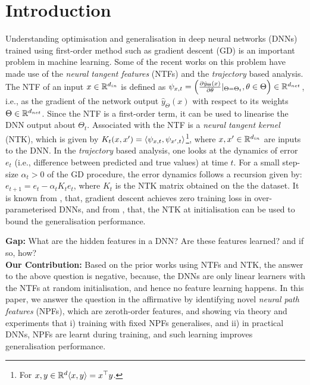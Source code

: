 \section{Introduction}
Understanding optimisation and generalisation in deep neural networks (DNNs) trained using first-order method such as gradient descent (GD) is an important problem in machine learning. Some of the recent works on this problem have made use of the \emph{neural tangent features} (NTFs) and the \emph{trajectory} based analysis. The NTF of an input $x\in \mathbb{R}^{d_{in}}$ is defined as $\psi_{x,t}=\left(\frac{\partial \hat{y}_{\Theta}(x)}{\partial \theta}|_{\Theta=\Theta_t},\theta \in \Theta\right)\in \mathbb{R}^{d_{net}}$, i.e., as the gradient of the network output $\hat{y}_{\Theta}(x)$ with respect to its weights $\Theta\in\mathbb{R}^{d_{net}}$. Since the NTF is a first-order term, it can be used to linearise the DNN output about $\Theta_t$. Associated with the NTF is a \emph{neural tangent kernel} (NTK), which is given by $K_t(x,x')=\langle \psi_{x,t},\psi_{x',t}\rangle$\footnote{For $x,y\in\mathbb{R}^d \langle x,y\rangle=x^\top y$.}, where $x,x'\in\mathbb{R}^{d_{in}}$ are inputs to the DNN. In the \emph{trajectory} based analysis, one looks at the dynamics of error $e_t$  (i.e., difference between predicted and true values) at time $t$. For a small step-size $\alpha_t>0$ of the GD procedure, the error dynamics follows a recursion given by: $e_{t+1}=e_t-\alpha_tK_te_t$, where $K_t$ is the NTK matrix obtained on the the dataset. It is known from \cite{dudnn}, that, gradient descent achieves zero training loss in over-parameterised DNNs, and from \cite{cao2019generalization}, that, the NTK at initialisation can be used to bound the generalisation performance.

\textbf{Gap:} What are the hidden features in a DNN? Are these features learned? and if so, how?\\
\textbf{Our Contribution:} Based on the prior works using NTFs and NTK, the answer to the above question is negative, because, the DNNs are only linear learners with the NTFs at random initialisation, and hence no feature learning happens. In this paper, we answer the question in the affirmative by identifying novel \emph{neural path features} (NPFs), which are zeroth-order features, and showing via theory and experiments that i) training with fixed NPFs generalises, and ii) in practical DNNs, NPFs are learnt during training, and such learning improves generalisation performance.


